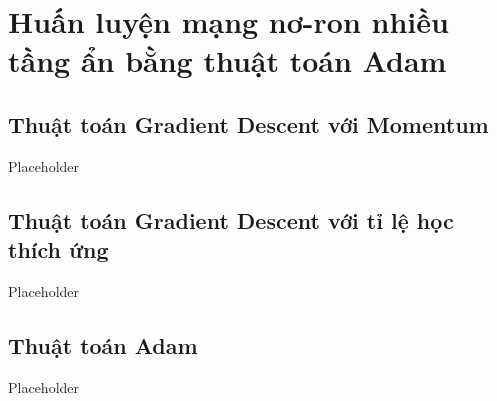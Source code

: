 \chapter{Huấn luyện mạng nơ-ron nhiều tầng ẩn bằng thuật toán Adam}
\label{Chapter3}

\section{Thuật toán Gradient Descent với Momentum}

Placeholder

\section{Thuật toán Gradient Descent với tỉ lệ học thích ứng}

Placeholder

\section{Thuật toán Adam}

Placeholder